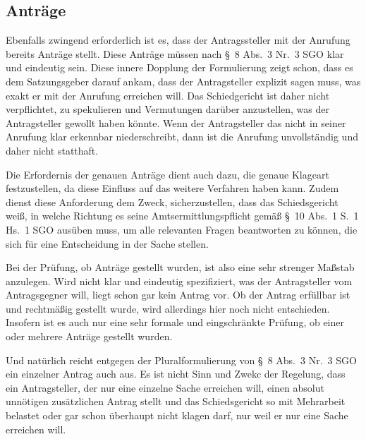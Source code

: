 \subsection{Anträge}
\label{Standardworkflow:Antraege}
Ebenfalls zwingend erforderlich ist es, dass der Antragssteller mit der Anrufung bereits Anträge stellt.
Diese Anträge müssen nach \S~8 Abs.~3 Nr.~3 SGO klar und eindeutig sein.
Diese innere Dopplung der Formulierung zeigt schon, dass es dem Satzungsgeber darauf ankam, dass der Antragsteller explizit sagen muss, was exakt er mit der Anrufung erreichen will.
Das Schiedgericht ist daher nicht verpflichtet, zu spekulieren und Vermutungen darüber anzustellen, was der Antragsteller gewollt haben könnte. 
Wenn der Antragsteller das nicht in seiner Anrufung klar erkennbar niederschreibt, dann ist die Anrufung unvollständig und daher nicht statthaft.

Die Erfordernis der genauen Anträge dient auch dazu, die genaue Klageart festzustellen, da diese Einfluss auf das weitere Verfahren haben kann.
Zudem dienst diese Anforderung dem Zweck, sicherzustellen, dass das Schiedsgericht weiß, in welche Richtung es seine Amtsermittlungspflicht gemäß \S~10 Abs.~1 S.~1 Hs.~1 SGO ausüben muss, um alle relevanten Fragen beantworten zu können, die sich für eine Entscheidung in der Sache stellen.

Bei der Prüfung, ob Anträge gestellt wurden, ist also eine sehr strenger Maßstab anzulegen. Wird nicht klar und eindeutig spezifiziert, was der Antragsteller vom Antragsgegner will, liegt schon gar kein Antrag vor.
Ob der Antrag erfüllbar ist und rechtmäßig gestellt wurde, wird allerdings hier noch nicht entschieden.
Insofern ist es auch nur eine sehr formale und eingschränkte Prüfung, ob einer oder mehrere Anträge gestellt wurden.

Und natürlich reicht entgegen der Pluralformulierung von \S~8 Abs.~3 Nr.~3 SGO ein einzelner Antrag auch aus. Es ist nicht Sinn und Zwekc der Regelung, dass ein Antragsteller, der nur eine einzelne Sache erreichen will, einen absolut unnötigen zusätzlichen Antrag stellt und das Schiedsgericht so mit Mehrarbeit belastet oder gar schon überhaupt nicht klagen darf, nur weil er nur eine Sache erreichen will.

